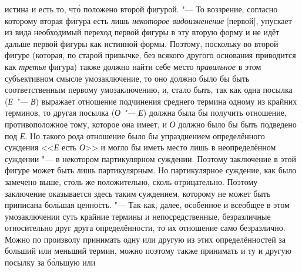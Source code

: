 истина и есть то, чт\'{о} положено второй фигурой. "--- То
воззрение, согласно которому вторая фигура есть лишь
{\em некоторое видоизменение}
[первой], упускает из вида необходимый переход первой фигуры
в эту вторую форму и не идёт дальше первой фигуры как
истинной формы. Поэтому, поскольку во второй фигуре (которая, по старой
привычке, без всякого другого основания приводится как
{\em третья} фигура) также должно найти себе место {\em правильное} в этом
субъективном смысле умозаключение, то оно должно было бы быть
соответственным первому умозаключению, и, стало быть, так как одна посылка
({\em Е "--- В}) выражает отношение подчинения среднего термина одному из
крайних терминов, то другая посылка ({\em О "--- Е})
должна была бы получить отношение, противоположное тому,
которое она имеет, и {\em О} должно было бы быть подведено под
{\em Е}. Но такого рода отношение было бы упразднением определённого суждения
<<{\em Е} есть {\em О}>> и могло бы иметь
место лишь в неопределённом суждении "--- в некотором
партикулярном суждении. Поэтому заключение в этой фигуре может быть лишь
партикулярным. Но партикулярное суждение, как было замечено выше, столь же
положительно, сколь отрицательно. Поэтому заключение оказывается здесь
таким суждением, которому не может быть приписана большая ценность. "---
Так как, далее, особенное и всеобщее в этом умозаключении
суть крайние термины и непосредственные, безразличные относительно друг
друга определённости, то их отношение само безразлично. Можно по произволу
принимать одну или другую из этих определённостей за больший или меньший
термин, можно поэтому также принимать и ту и другую посылку за б\'{о}льшую или
